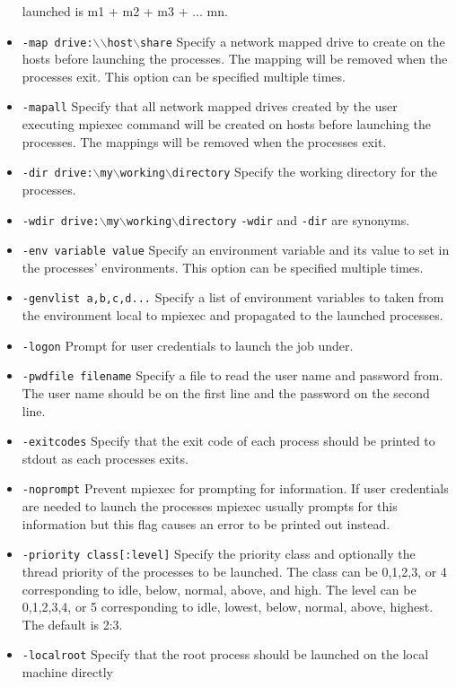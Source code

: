 \documentclass[dvipdfm,11pt]{article}
\begin{document}
\begin{itemize}
launched is m1 + m2 + m3 + ... mn.
\item \texttt{-map drive:$\backslash$$\backslash$host$\backslash$share}
Specify a network mapped drive to create on the hosts before launching the 
processes.  The mapping will be removed when the processes exit.  This option
can be specified multiple times.
\item \texttt{-mapall}
Specify that all network mapped drives created by the user executing mpiexec
command will be created on hosts before launching the processes. The mappings
will be removed when the processes exit. 
\item \texttt{-dir drive:$\backslash$my$\backslash$working$\backslash$directory}
Specify the working directory for the processes.
\item \texttt{-wdir drive:$\backslash$my$\backslash$working$\backslash$directory}
\texttt{-wdir} and \texttt{-dir} are synonyms.
\item \texttt{-env variable value}
Specify an environment variable and its value to set in the processes' environments.
This option can be specified multiple times.
\item \texttt{-genvlist a,b,c,d...}
Specify a list of environment variables to taken from the environment local to mpiexec and propagated to the launched processes.
\item \texttt{-logon}
Prompt for user credentials to launch the job under.
\item \texttt{-pwdfile filename}
Specify a file to read the user name and password from.  The user name should be
on the first line and the password on the second line.
\item \texttt{-exitcodes}
Specify that the exit code of each process should be printed to stdout as each
processes exits.
\item \texttt{-noprompt}
Prevent mpiexec for prompting for information.  If user credentials are needed
to launch the processes mpiexec usually prompts for this information but this
flag causes an error to be printed out instead.
\item \texttt{-priority class[:level]}
Specify the priority class and optionally the thread priority of the processes
to be launched.  The class can be 0,1,2,3, or 4 corresponding to idle, below,
normal, above, and high.  The level can be 0,1,2,3,4, or 5 corresponding to
idle, lowest, below, normal, above, highest.  The default is 2:3.
\item \texttt{-localroot}
Specify that the root process should be launched on the local machine directly

\end{itemize}
\end{document}
